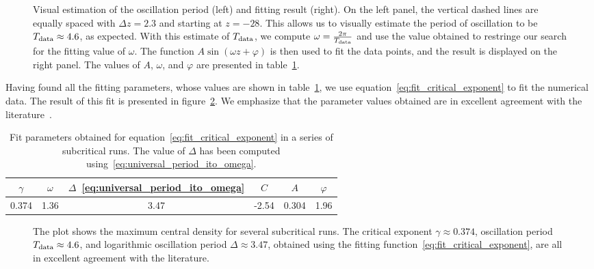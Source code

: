 \documentclass[a4paper,11pt]{article}
\newcommand{\g}{\gamma}
\newcommand{\D}{\Delta}
\newcommand{\lrpar}[1]{\left( #1 \right)}
\begin{document}
\begin{figure}[H]
  \centering
  
  \caption[Visual estimation of the oscillation period and fit.]{Visual estimation of the oscillation period (left) and fitting result (right). On the left panel, the vertical dashed lines are equally spaced with $\D z = 2.3$ and starting at $z=-28$. This allows us to visually estimate the period of oscillation to be $T_{\rm data}\approx4.6$, as expected. With this estimate of $T_{\rm data}$, we compute $\omega = \frac{2\pi}{T_{\rm data}}$ and use the value obtained to restringe our search for the fitting value of $\omega$. The function $A\sin\lrpar{\omega z+\varphi}$ is then used to fit the data points, and the result is displayed on the right panel. The values of $A$, $\omega$, and $\varphi$ are presented in table~\ref{tab:fit_critical_exponent}.}
  \label{fig:critical_exponent_oscillation}
\end{figure}

Having found all the fitting parameters, whose values are shown in table~\ref{tab:fit_critical_exponent}, we use equation~\eqref{eq:fit_critical_exponent} to fit the numerical data. The result of this fit is presented in figure~\ref{fig:critical_exponent}. We emphasize that the parameter values obtained are in excellent agreement with the literature~\cite{PhysRevLett.70.9,Baumgarte_2018,PhysRevD.55.R440,PhysRevD.92.084037}.

\begin{table}[ht]
  \centering
  \begin{tabular}{cccccc}
    \hline
    \hline
    $\g$ & $\omega$ & $\D$~\eqref{eq:universal_period_ito_omega} & $C$ & $A$ & $\varphi$\\
    \hline
    0.374 & 1.36 & 3.47 & -2.54 & 0.304 & 1.96\\
    \hline
    \hline
  \end{tabular}
  \caption[Fit parameters for the behaviour of the central energy density in a serries of subcritical runs.]{Fit parameters obtained for equation~\eqref{eq:fit_critical_exponent} in a series of subcritical runs. The value of $\D$ has been computed using~\eqref{eq:universal_period_ito_omega}.}
  \label{tab:fit_critical_exponent}
\end{table}

\begin{figure}[H]
  \centering
  
  \caption[Central energy density near criticality.]{The plot shows the maximum central density for several subcritical runs. The critical exponent $\gamma\approx0.374$, oscillation period $T_{\rm data}\approx4.6$, and logarithmic oscillation period $\D\approx3.47$, obtained using the fitting function~\eqref{eq:fit_critical_exponent}, are all in excellent agreement with the literature.}
  \label{fig:critical_exponent}
\end{figure}
\end{document}
